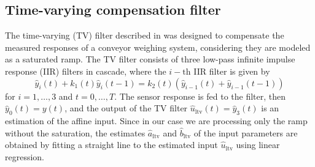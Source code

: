 \subsection{Time-varying compensation filter}
The time-varying (TV) filter described in \cite{Pietrzak14} was designed to compensate the measured responses of a conveyor weighing system, considering they are modeled as a saturated ramp.
The TV filter consists of three low-pass infinite impulse response (IIR) filters in cascade, where the $i-\mathrm{th}$ IIR filter is given by
\begin{equation} \widehat{y}_i(t) + k_1(t) \widehat{y}_i(t-1) = k_2(t) \left( \widehat{y}_{i-1}(t) + \widehat{y}_{i-1}(t-1) \right) \end{equation}
for $i = 1,\ldots,3$ and $t=0,\ldots,T$.
The sensor response is fed to the filter, then $\widehat{y}_0(t) = y(t)$, and the output of the TV filter $\widehat{u}_\mathrm{ltv}(t) = \widehat{y}_3(t)$ is an estimation of the affine input.
Since in our case we are processing only the ramp without the saturation, the estimates $\widehat{a}_\mathrm{ltv}$ and $\widehat{b}_\mathrm{ltv}$ of the input parameters are obtained by fitting a straight line to the estimated input $\widehat{u}_\mathrm{ltv}$ using linear regression.

